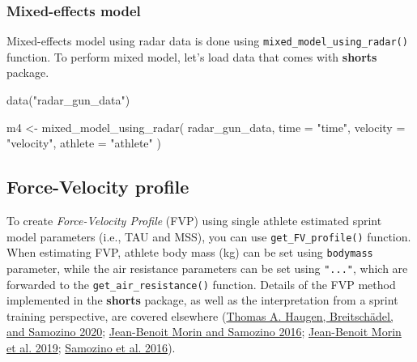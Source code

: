 \documentclass[fleqn,10pt,lineno]{wlpeerj} %
\newenvironment{Shaded}{\begin{snugshade}}{\end{snugshade}}
\newcommand{\AttributeTok}[1]{\textcolor[rgb]{0.77,0.63,0.00}{#1}}
\newcommand{\FunctionTok}[1]{\textcolor[rgb]{0.00,0.00,0.00}{#1}}
\newcommand{\NormalTok}[1]{#1}
\newcommand{\OtherTok}[1]{\textcolor[rgb]{0.56,0.35,0.01}{#1}}
\newcommand{\StringTok}[1]{\textcolor[rgb]{0.31,0.60,0.02}{#1}}
\begin{document}
\hypertarget{mixed-effects-model-1}{%
\subsubsection{Mixed-effects model}\label{mixed-effects-model-1}}

Mixed-effects model using radar data is done using \texttt{mixed\_model\_using\_radar()} function. To perform mixed model, let's load data that comes with \textbf{shorts} package.

\begin{Shaded}
\begin{Highlighting}[]
\FunctionTok{data}\NormalTok{(}\StringTok{"radar\_gun\_data"}\NormalTok{)}

\NormalTok{m4 }\OtherTok{\textless{}{-}} \FunctionTok{mixed\_model\_using\_radar}\NormalTok{(}
\NormalTok{  radar\_gun\_data,}
  \AttributeTok{time =} \StringTok{"time"}\NormalTok{,}
  \AttributeTok{velocity =} \StringTok{"velocity"}\NormalTok{,}
  \AttributeTok{athlete =} \StringTok{"athlete"}
\NormalTok{)}
\end{Highlighting}
\end{Shaded}

\hypertarget{force-velocity-profile}{%
\subsection{Force-Velocity profile}\label{force-velocity-profile}}

To create \emph{Force-Velocity Profile} (FVP) using single athlete estimated sprint model parameters (i.e., TAU and MSS), you can use \texttt{get\_FV\_profile()} function. When estimating FVP, athlete body mass (kg) can be set using \texttt{bodymass} parameter, while the air resistance parameters can be set using \texttt{"..."}, which are forwarded to the \texttt{get\_air\_resistance()} function. Details of the FVP method implemented in the \textbf{shorts} package, as well as the interpretation from a sprint training perspective, are covered elsewhere (\protect\hyperlink{ref-haugenPowerForceVelocityProfilingSprinting2020}{Thomas A. Haugen, Breitschädel, and Samozino 2020}; \protect\hyperlink{ref-morinInterpretingPowerForceVelocityProfiles2016}{Jean-Benoit Morin and Samozino 2016}; \protect\hyperlink{ref-morinSimpleMethodComputing2019}{Jean-Benoit Morin et al. 2019}; \protect\hyperlink{ref-samozinoSimpleMethodMeasuring2016}{Samozino et al. 2016}).
\end{document}
